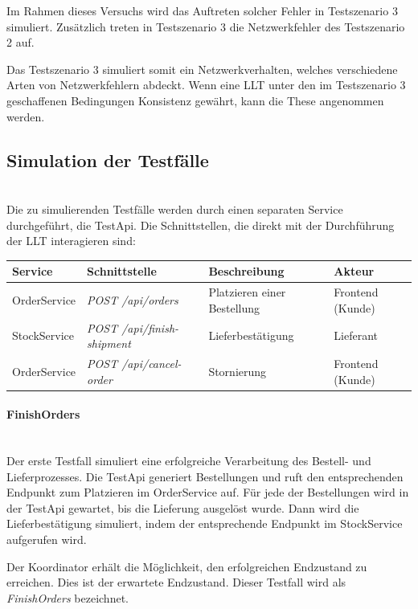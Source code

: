 Im Rahmen dieses Versuchs wird das Auftreten solcher Fehler in Testszenario 3 simuliert. Zusätzlich treten in Testszenario 3 die Netzwerkfehler des Testszenario 2 auf. 

Das Testszenario 3 simuliert somit ein Netzwerkverhalten, welches verschiedene Arten von Netzwerkfehlern abdeckt. Wenn eine LLT unter den im Testszenario 3 geschaffenen Bedingungen Konsistenz gewährt, kann die These angenommen werden.


\subsection{Simulation der Testfälle} \mbox{}\\
Die zu simulierenden Testfälle werden durch einen separaten Service durchgeführt, die TestApi. Die Schnittstellen, die direkt mit der Durchführung der LLT interagieren sind:

\begin{center}
	\begin{longtable}[h]{|p{2.3cm}|p{4.9cm}|p{3.2cm}|p{3.4cm}|}
		\hline
		Service & Schnittstelle & Beschreibung & Akteur \\ \hline
		OrderService & \textit{POST /api/orders} & Platzieren einer Bestellung & Frontend (Kunde) \\ \hline
		StockService & \textit{POST /api/finish-shipment} & Lieferbestätigung & Lieferant \\ \hline
		OrderService & \textit{POST /api/cancel-order} & Stornierung & Frontend (Kunde) \\ \hline
	\end{longtable}
\end{center}
\FloatBarrier

\paragraph*{FinishOrders} \mbox{}\\
Der erste Testfall simuliert eine erfolgreiche Verarbeitung des Bestell- und Lieferprozesses. Die TestApi generiert Bestellungen und ruft den entsprechenden Endpunkt zum Platzieren im OrderService auf. Für jede der Bestellungen wird in der TestApi gewartet, bis die Lieferung ausgelöst wurde. Dann wird die Lieferbestätigung simuliert, indem der entsprechende Endpunkt im StockService aufgerufen wird. 

Der Koordinator erhält die Möglichkeit, den erfolgreichen Endzustand zu erreichen. Dies ist der erwartete Endzustand. Dieser Testfall wird als \textit{FinishOrders} bezeichnet. 


